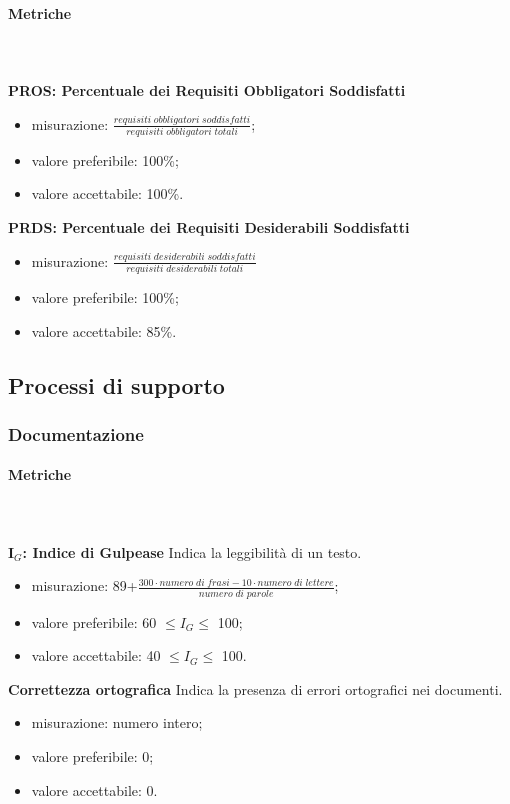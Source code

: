 			\paragraph{Metriche} \mbox{} \\ \\
				\textbf{PROS: Percentuale dei Requisiti Obbligatori Soddisfatti} 
				\begin{itemize}
					\item misurazione: $\frac{requisiti \; obbligatori \; soddisfatti}{requisiti \; obbligatori \; totali}$;
					\item valore preferibile: 100\%;
					\item valore accettabile: 100\%.
				\end{itemize}
				\textbf{PRDS: Percentuale dei Requisiti Desiderabili Soddisfatti} 
				\begin{itemize}
					\item misurazione: $\frac{requisiti \; desiderabili \; soddisfatti}{requisiti \; desiderabili \; totali}$
					\item valore preferibile: 100\%;
					\item valore accettabile: 85\%.
				\end{itemize}
			
	\subsection{Processi di supporto}		
		\subsubsection{Documentazione}
			\paragraph{Metriche} \mbox{} \\ \\
			\textbf{I$_{G}$: Indice di Gulpease} Indica la leggibilità di un testo.
			\begin{itemize}
				\item misurazione: 89+$\frac{300\cdot numero \; di \; frasi-10\cdot numero \; di \; lettere}{numero \; di \; parole}$;
				\item valore preferibile: 60 $\le I_{G} \le$ 100;
				\item valore accettabile: 40 $\le I_{G} \le$ 100.
			\end{itemize}
			\textbf{Correttezza ortografica} Indica la presenza di errori ortografici nei documenti.
			\begin{itemize}
				\item misurazione: numero intero;
				\item valore preferibile: 0;
				\item valore accettabile: 0.
			\end{itemize}
				

